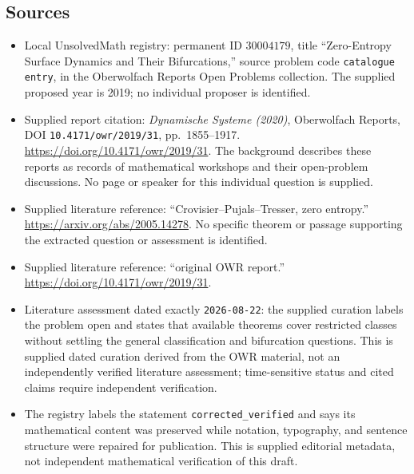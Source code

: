 \documentclass[11pt]{article}
\begin{document}
\subsection{Sources}
\begin{itemize}
\item Local UnsolvedMath registry: permanent ID \(30004179\), title ``Zero-Entropy Surface Dynamics and Their Bifurcations,'' source problem code \texttt{catalogue entry}, in the Oberwolfach Reports Open Problems collection. The supplied proposed year is 2019; no individual proposer is identified.
\item Supplied report citation: \emph{Dynamische Systeme (2020)}, Oberwolfach Reports, DOI \texttt{10.4171/owr/2019/31}, pp.\ 1855--1917. \url{https://doi.org/10.4171/owr/2019/31}. The background describes these reports as records of mathematical workshops and their open-problem discussions. No page or speaker for this individual question is supplied.
\item Supplied literature reference: ``Crovisier--Pujals--Tresser, zero entropy.'' \url{https://arxiv.org/abs/2005.14278}. No specific theorem or passage supporting the extracted question or assessment is identified.
\item Supplied literature reference: ``original OWR report.'' \url{https://doi.org/10.4171/owr/2019/31}.
\item Literature assessment dated exactly \texttt{2026-08-22}: the supplied curation labels the problem open and states that available theorems cover restricted classes without settling the general classification and bifurcation questions. This is supplied dated curation derived from the OWR material, not an independently verified literature assessment; time-sensitive status and cited claims require independent verification.
\item The registry labels the statement \texttt{corrected\_verified} and says its mathematical content was preserved while notation, typography, and sentence structure were repaired for publication. This is supplied editorial metadata, not independent mathematical verification of this draft.
\end{itemize}
\end{document}
